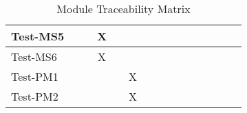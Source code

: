 \documentclass[12pt, titlepage]{article}
\begin{document}
\begin{table}[H]
\begin{adjustwidth}{-0.3in}{-0.5in}
{\begin{tabular}{c|c|c|c|c|c|c|c|c|c|c|c|c|c|c|}
\multicolumn{1}{|l|}{{Test-MS5}}   &             &             &    X         &             &             &             &             &             &              &              &              &             &  &                    \\ \hline
\multicolumn{1}{|l|}{{Test-MS6}}   &             &             &    X         &             &             &             &             &             &              &              &              &             &  &                    \\ \hline
\multicolumn{1}{|l|}{{Test-PM1}}   &             &             &             &             &    X         &             &             &             &              &              &              &             &  &                    \\ \hline
\multicolumn{1}{|l|}{{Test-PM2}}   &             &             &             &             &      X       &             &             &             &              &              &              &             &  &                    \\ \hline
\end{tabular}}
\caption{Module Traceability Matrix}
    \label{tab:matrix4}
\end{adjustwidth}
\end{table}
\end{document}
